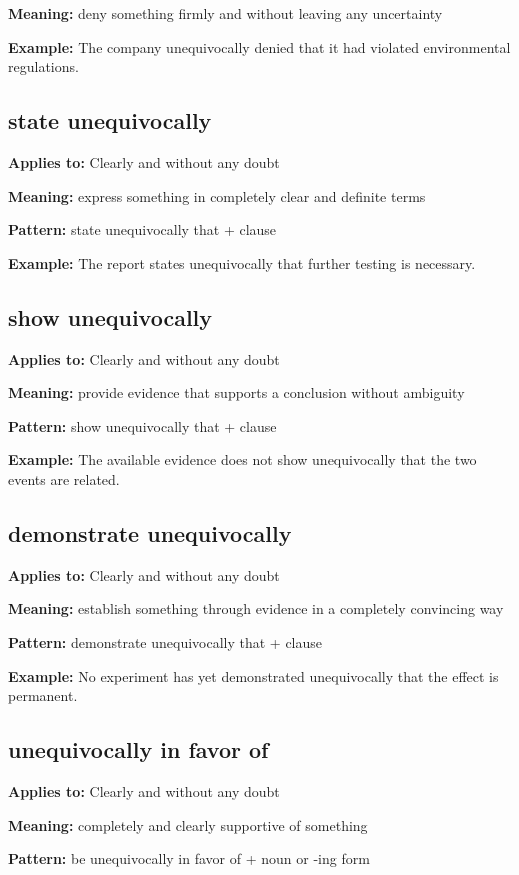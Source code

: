 \documentclass[11pt]{article}
\begin{document}
\textbf{Meaning:} deny something firmly and without leaving any uncertainty

\textbf{Example:} The company unequivocally denied that it had violated environmental regulations.

\subsection{state unequivocally}
\textbf{Applies to:} Clearly and without any doubt

\textbf{Meaning:} express something in completely clear and definite terms

\textbf{Pattern:} state unequivocally that + clause

\textbf{Example:} The report states unequivocally that further testing is necessary.

\subsection{show unequivocally}
\textbf{Applies to:} Clearly and without any doubt

\textbf{Meaning:} provide evidence that supports a conclusion without ambiguity

\textbf{Pattern:} show unequivocally that + clause

\textbf{Example:} The available evidence does not show unequivocally that the two events are related.

\subsection{demonstrate unequivocally}
\textbf{Applies to:} Clearly and without any doubt

\textbf{Meaning:} establish something through evidence in a completely convincing way

\textbf{Pattern:} demonstrate unequivocally that + clause

\textbf{Example:} No experiment has yet demonstrated unequivocally that the effect is permanent.

\subsection{unequivocally in favor of}
\textbf{Applies to:} Clearly and without any doubt

\textbf{Meaning:} completely and clearly supportive of something

\textbf{Pattern:} be unequivocally in favor of + noun or -ing form
\end{document}
